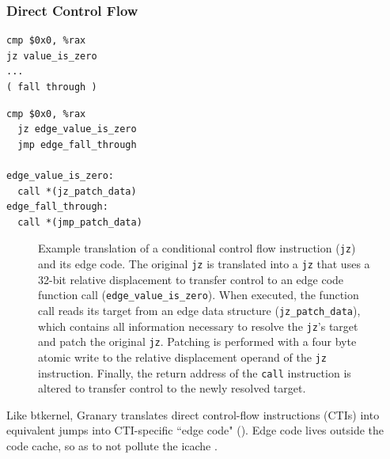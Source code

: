 \documentclass[preprint]{sigplanconf}
\begin{document}
\subsubsection{Direct Control Flow}
\lstset{language=[x64]Assembler}
\newsavebox\nativejcc
\begin{lrbox}{\nativejcc}
\begin{minipage}[b]{4cm}
\begin{lstlisting}[basicstyle=\footnotesize\ttfamily]
cmp $0x0, %rax
jz value_is_zero 
...
( fall through )
\end{lstlisting}
\end{minipage}
\end{lrbox}

\newsavebox\translatedjcc
\begin{lrbox}{\translatedjcc}\begin{minipage}[b]{4cm}\begin{lstlisting}[basicstyle=\footnotesize\ttfamily]
  cmp $0x0, %rax
  jz edge_value_is_zero
  jmp edge_fall_through

edge_value_is_zero:
  call *(jz_patch_data)
edge_fall_through:
  call *(jmp_patch_data)
\end{lstlisting}
\end{minipage}
\end{lrbox}

\begin{figure}[t!]
\hfill
{}
\caption{\label{fig:direct_edge_code}Example translation of a conditional control flow instruction (\texttt{jz}) and its edge code. The original \texttt{jz} is translated into a \texttt{jz} that uses a 32-bit relative displacement to transfer control to an edge code function call (\texttt{edge\_value\_is\_zero}). When executed, the function call reads its target from an edge data structure (\texttt{jz\_patch\_data}), which contains all information necessary to resolve the \texttt{jz}'s target and patch the original \texttt{jz}. Patching is performed with a four byte atomic write to the relative displacement operand of the \texttt{jz} instruction. Finally, the return address of the \texttt{call} instruction is altered to transfer control to the newly resolved target.}
\end{figure}
Like btkernel, Granary translates direct control-flow instructions (CTIs) into equivalent jumps into CTI-specific ``edge code" (). Edge code lives outside the code cache, so as to not pollute the icache \cite{btkernel}.
\end{document}

